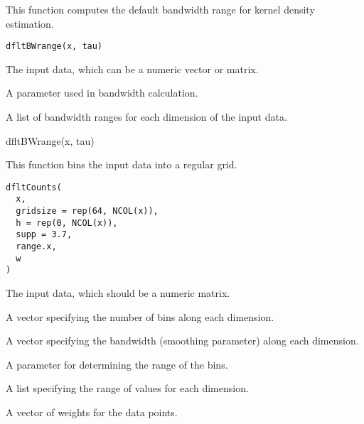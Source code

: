 \documentclass[a4paper]{book}
\begin{document}
%
\begin{Description}\relax
This function computes the default bandwidth range for kernel density estimation.
\end{Description}
%
\begin{Usage}
\begin{verbatim}
dfltBWrange(x, tau)
\end{verbatim}
\end{Usage}
%
\begin{Arguments}
\begin{ldescription}
\item[\code{x}] The input data, which can be a numeric vector or matrix.

\item[\code{tau}] A parameter used in bandwidth calculation.
\end{ldescription}
\end{Arguments}
%
\begin{Value}
A list of bandwidth ranges for each dimension of the input data.
\end{Value}
%
\begin{Examples}
\begin{ExampleCode}
dfltBWrange(x, tau)
\end{ExampleCode}
\end{Examples}
%
\begin{Description}\relax
This function bins the input data into a regular grid.
\end{Description}
%
\begin{Usage}
\begin{verbatim}
dfltCounts(
  x,
  gridsize = rep(64, NCOL(x)),
  h = rep(0, NCOL(x)),
  supp = 3.7,
  range.x,
  w
)
\end{verbatim}
\end{Usage}
%
\begin{Arguments}
\begin{ldescription}
\item[\code{x}] The input data, which should be a numeric matrix.

\item[\code{gridsize}] A vector specifying the number of bins along each dimension.

\item[\code{h}] A vector specifying the bandwidth (smoothing parameter) along each dimension.

\item[\code{supp}] A parameter for determining the range of the bins.

\item[\code{range.x}] A list specifying the range of values for each dimension.

\item[\code{w}] A vector of weights for the data points.
\end{ldescription}
\end{Arguments}
\end{document}
